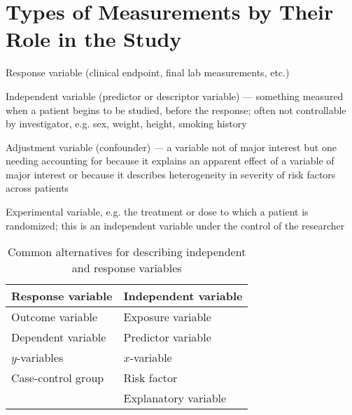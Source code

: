 \section{Types of Measurements by Their Role in the Study}  
\bi
 \item Response variable (clinical endpoint, final lab measurements,
   etc.)
 \item Independent variable (predictor or descriptor variable) ---
   something measured when a patient begins to be studied, before the
   response; often not controllable by 
   investigator, e.g. sex, weight, height, smoking history
 \item Adjustment variable (confounder) --- a variable not of major
   interest but one needing accounting for because it explains an
   apparent effect of a variable of major interest or because it
   describes heterogeneity in severity of risk factors across patients
 \item Experimental variable, e.g. the treatment or dose to which a
   patient is randomized; this is an independent variable under the
   control of the researcher
 \ei

\begin{table}[h!]
 \caption{Common alternatives for describing independent and response variables}
\begin{center}
\begin{tabular}{ll} \hline \hline
Response variable & Independent variable \\ \hline
Outcome variable & Exposure variable \\
Dependent variable & Predictor variable \\
$y$-variables &  $x$-variable \\
Case-control group &  Risk factor \\
 & Explanatory variable \\ \hline \hline
\end{tabular}
\end{center}
\end{table}

